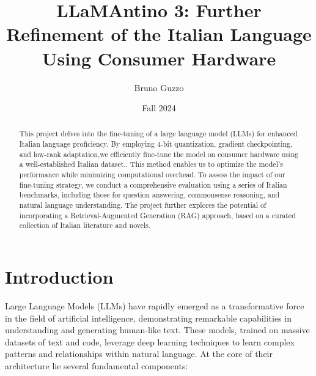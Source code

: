 \documentclass{article}
\title{LLaMAntino 3: Further Refinement of the Italian Language Using Consumer Hardware}
\author{Bruno Guzzo}
\date{Fall 2024}
\begin{document}
	
	\maketitle
	
	\begin{abstract}
		This project delves into the fine-tuning of a large language model (LLMs) for enhanced Italian language proficiency. 
		By employing 4-bit quantization, gradient checkpointing, and low-rank adaptation,we efficiently fine-tune the model on consumer hardware using a well-established Italian dataset.. 
		This method enables us to optimize the model's performance while minimizing computational overhead.
		To assess the impact of our fine-tuning strategy, we conduct a comprehensive evaluation using a series of Italian benchmarks, including those for question answering, commonsense reasoning, and natural language understanding.
		The project further explores the potential of incorporating a Retrieval-Augmented Generation (RAG) approach, based on a curated collection of Italian literature and novels.
	\end{abstract}
	
	\section{Introduction}
		Large Language Models (LLMs) have rapidly emerged as a transformative force in the field of artificial intelligence, demonstrating remarkable capabilities in understanding and generating human-like text. 
		These models, trained on massive datasets of text and code, leverage deep learning techniques to learn complex patterns and relationships within natural language. 
		At the core of their architecture lie several fundamental components:
		
\end{document}

